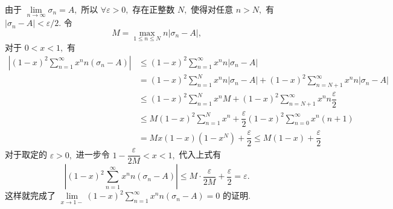 \begin{solution}
\begin{enumerate}
    由于 $\lim\limits_{n\to\infty} \sigma_n = A,$ 所以 $\forall \varepsilon > 0,$ 存在正整数 $N,$ 使得对任意 $n > N,$ 有 $\lvert \sigma_n - A \rvert < \varepsilon / 2.$ 令
    $$M = \max\limits_{1\leqslant n \leqslant N} n \lvert \sigma_n - A \rvert,$$
    对于 $0 < x < 1,$ 有
    \begin{align*}
      \left\lvert (1-x)^2 \sum\limits_{n=1}^\infty x^n n (\sigma_n - A) \right\rvert & \leqslant (1-x)^2 \sum\limits_{n=1}^\infty x^n n \lvert \sigma_n - A \rvert \\
      & = (1-x)^2 \sum\limits_{n=1}^N x^n n \lvert \sigma_n - A \rvert + (1-x)^2 \sum\limits_{n=N+1}^\infty x^n n \lvert \sigma_n - A \rvert \\
      & \leqslant (1-x)^2 \sum\limits_{n=1}^N x^n M + (1-x)^2 \sum\limits_{n=N+1}^\infty x^n n \dfrac{\varepsilon}{2} \\
      & \leqslant M (1-x)^2 \sum\limits_{n=1}^N x^n + \dfrac{\varepsilon}{2} (1-x)^2 \sum\limits_{n=0}^\infty x^n (n + 1) \\
      & = M x (1 - x) (1 - x^N) + \dfrac{\varepsilon}{2} \leqslant M (1 - x) + \dfrac{\varepsilon}{2}
    \end{align*}
  对于取定的 $\varepsilon > 0,$ 进一步令 $1 - \dfrac{\varepsilon}{2M} < x < 1,$ 代入上式有
  $$\left\lvert (1-x)^2 \sum\limits_{n=1}^\infty x^n n (\sigma_n - A) \right\rvert \leqslant M \cdot \dfrac{\varepsilon}{2M} + \dfrac{\varepsilon}{2} = \varepsilon.$$
  这样就完成了 $\lim\limits_{x \to 1-} (1-x)^2 \sum\limits_{n=1}^\infty x^n n (\sigma_n - A) = 0$ 的证明.
  \end{enumerate}
\end{solution}


